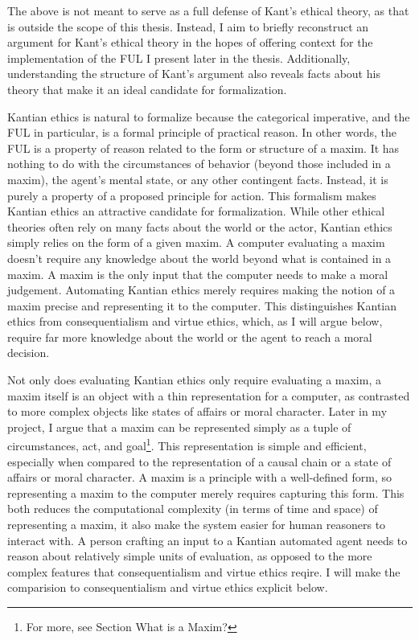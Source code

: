 \begin{isabellebody}
\begin{isamarkuptext}
The above is not meant to serve as a full defense of Kant's ethical theory, as that is outside the scope
of this thesis. Instead, I aim to briefly reconstruct an argument for Kant's ethical theory in the hopes 
of offering context for the implementation of the FUL I present later in the thesis. Additionally, understanding 
the structure of Kant's argument also reveals facts about his theory that make it an ideal candidate 
for formalization.%
\end{isamarkuptext}\isamarkuptrue%
%
\isadelimdocument
%
\endisadelimdocument
%
\isatagdocument
%
\isamarkuptrue%
%
\endisatagdocument
{\isafolddocument}%
%
\isadelimdocument
%
\endisadelimdocument
%
\begin{isamarkuptext}%
Kantian ethics is natural to formalize because the categorical imperative, and the FUL in particular, 
is a formal principle of practical reason. In other words, the FUL is a property of reason related 
to the form or structure of a maxim. It has nothing to do with the circumstances of behavior 
(beyond those included in a maxim), the agent's mental state, or any other contingent facts. Instead, 
it is purely a property of a proposed principle for action. This formalism makes Kantian ethics an 
attractive candidate for formalization. While other ethical theories often rely on many facts about 
the world or the actor, Kantian ethics simply relies on the form of a given maxim. A computer evaluating 
a maxim doesn't require any knowledge about the world beyond what is contained in a maxim. A maxim 
is the only input that the computer needs to make a moral judgement. Automating 
Kantian ethics merely requires making the notion of a maxim precise and representing it to the computer. 
This distinguishes Kantian ethics from consequentialism and virtue ethics, which, as I will argue below, 
require far more knowledge about the world or the agent to reach a moral decision.

Not only does evaluating Kantian ethics only require evaluating a maxim, a maxim itself is an object
with a thin representation for a computer, as contrasted to more complex objects like states of 
affairs or moral character. Later in my project, I argue that a maxim can be represented simply as 
a tuple of circumstances, act, and goal\footnote{For more, see Section What is a Maxim?}. This representation
is simple and efficient, especially when compared to the representation of a causal chain or a state of 
affairs or moral character. A maxim is a principle with a well-defined form, so representing a maxim
to the computer merely requires capturing this form. This both reduces the computational complexity
(in terms of time and space) of representing a maxim, it also make the system easier for human reasoners
to interact with. A person crafting an input to a Kantian automated agent needs to reason about relatively
simple units of evaluation, as opposed to the more complex features that consequentialism and virtue
ethics reqire. I will make the comparision to consequentialism and virtue ethics explicit below.


\end{isamarkuptext}
\end{isabellebody}
